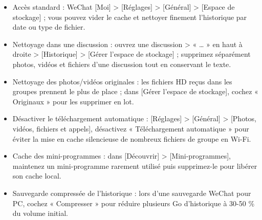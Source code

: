 
\begin{itemize}
  \item Accès standard : WeChat [Moi] > [Réglages] > [Général] > [Espace de stockage] ; vous pouvez vider le cache et nettoyer finement l'historique par date ou type de fichier.
  \item Nettoyage dans une discussion : ouvrez une discussion > « … » en haut à droite > [Historique] > [Gérer l'espace de stockage] ; supprimez séparément photos, vidéos et fichiers d'une discussion tout en conservant le texte.
  \item Nettoyage des photos/vidéos originales : les fichiers HD reçus dans les groupes prennent le plus de place ; dans [Gérer l'espace de stockage], cochez « Originaux » pour les supprimer en lot.
  \item Désactiver le téléchargement automatique : [Réglages] > [Général] > [Photos, vidéos, fichiers et appels], désactivez « Téléchargement automatique » pour éviter la mise en cache silencieuse de nombreux fichiers de groupe en Wi-Fi.
  \item Cache des mini-programmes : dans [Découvrir] > [Mini-programmes], maintenez un mini-programme rarement utilisé puis supprimez-le pour libérer son cache local.
  \item Sauvegarde compressée de l'historique : lors d'une sauvegarde WeChat pour PC, cochez « Compresser » pour réduire plusieurs Go d'historique à 30-50 \% du volume initial.
\end{itemize}


